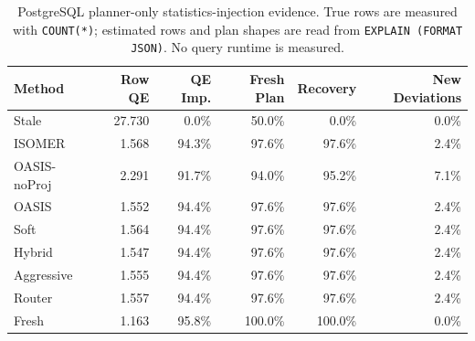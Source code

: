 \begin{table}[t]
  \centering
  \small
  \caption{PostgreSQL planner-only statistics-injection evidence. True rows are measured with \texttt{COUNT(*)}; estimated rows and plan shapes are read from \texttt{EXPLAIN (FORMAT JSON)}. No query runtime is measured.}
  \label{tab:postgres_planner_stats_injection}
  \setlength{\tabcolsep}{4pt}
  \begin{tabular}{lrrrrr}
    \toprule
    Method & Row QE & QE Imp. & Fresh Plan & Recovery & New Deviations \\
    \midrule
    Stale & 27.730 & 0.0\% & 50.0\% & 0.0\% & 0.0\% \\
    ISOMER & 1.568 & 94.3\% & 97.6\% & 97.6\% & 2.4\% \\
    OASIS-noProj & 2.291 & 91.7\% & 94.0\% & 95.2\% & 7.1\% \\
    OASIS & 1.552 & 94.4\% & 97.6\% & 97.6\% & 2.4\% \\
    Soft & 1.564 & 94.4\% & 97.6\% & 97.6\% & 2.4\% \\
    Hybrid & 1.547 & 94.4\% & 97.6\% & 97.6\% & 2.4\% \\
    Aggressive & 1.555 & 94.4\% & 97.6\% & 97.6\% & 2.4\% \\
    Router & 1.557 & 94.4\% & 97.6\% & 97.6\% & 2.4\% \\
    Fresh & 1.163 & 95.8\% & 100.0\% & 100.0\% & 0.0\% \\
    \bottomrule
  \end{tabular}
\end{table}
